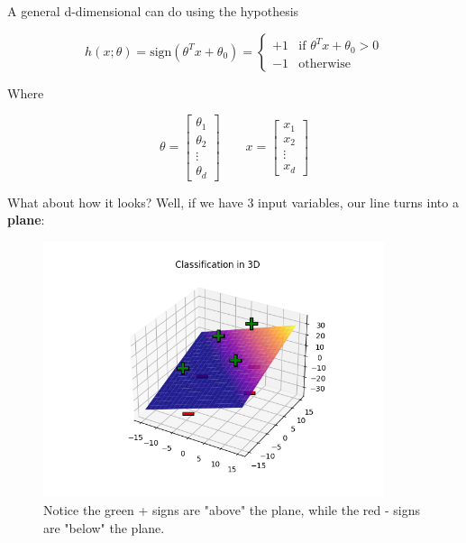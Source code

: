         \begin{kequation}
            A general d-dimensional  can do  using the hypothesis
            
            \begin{equation*}
                h(x; \theta) = \text{sign}(\theta^T x + \theta_0 )= 
                \begin{cases}
                    +1 & \text{if $\theta^T x + \theta_0 > 0$} \\
                    -1 & \text{otherwise}
                \end{cases}
            \end{equation*}
            
            Where
            
            \begin{equation*}
                \theta = 
                \begin{bmatrix}
                  \theta_1 \\ \theta_2 \\ \vdots \\ \theta_d
                \end{bmatrix}
                \qquad
                x =
                \begin{bmatrix}
                    x_1 \\ x_2 \\ \vdots \\ x_d
                \end{bmatrix}
            \end{equation*}
        \end{kequation}
        
        What about how it looks? Well, if we have 3 input variables, our line turns into a \textbf{plane}:
        
        \begin{figure}[H]
            \centering
            
            \includegraphics[width=100mm,scale=0.5]{images/classification_images/3d_classification_problem.png}

            \caption*{Notice the green + signs are "above" the plane, while the red - signs are "below" the plane.}
        \end{figure}
        
